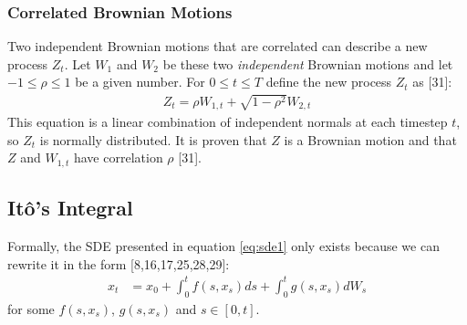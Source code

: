 \documentclass[12pt,twoside]{reedthesis}
\theoremstyle{definition}
\theoremstyle{definition}
\theoremstyle{remark}
\begin{document}
  \subsubsection{Correlated Brownian Motions}\label{corr}
  
  Two independent Brownian motions that are correlated can describe a new
  process \(Z_t\). Let \(W_1\) and \(W_2\) be these two \emph{independent}
  Brownian motions and let \(-1 \leq \rho \leq 1\) be a given number. For
  \(0 \leq t \leq T\) define the new process \(Z_t\) as {[}31{]}:
  \begin{align}
  \label{eq:corr_brow}
  Z_t = \rho W_{1,t} + \sqrt{1-\rho^2}W_{2,t}
  \end{align}
  \noindent
  This equation is a linear combination of independent normals at each
  timestep \(t\), so \(Z_t\) is normally distributed. It is proven that
  \(Z\) is a Brownian motion and that \(Z\) and \(W_{1,t}\) have
  correlation \(\rho\) {[}31{]}.
  
  \subsection{Itô's Integral}\label{itos-integral}
  
  Formally, the SDE presented in equation \eqref{eq:sde1} only exists
  because we can rewrite it in the form {[}8,16,17,25,28,29{]}:
  \begin{align} 
  \label{eq:sde2}
  x_t &= x_0 + \int_{0}^{t}{f(s, x_s)ds} + \int_{0}^{t}{g(s, x_s)dW_s}
  \end{align}
  \noindent
  for some \(f(s, x_s)\), \(g(s, x_s)\) and \(s \in [0,t]\).
  
\end{document}
